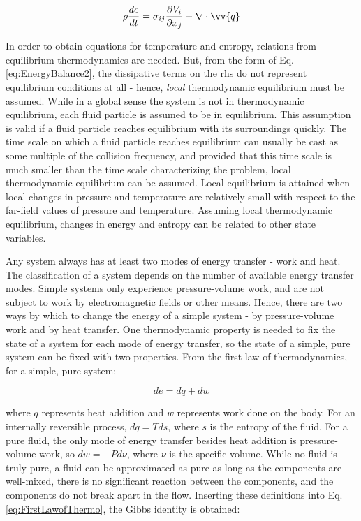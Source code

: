 \documentclass[10pt]{article}
\numberwithin{equation}{section} %
\begin{document}
\begin{equation}
\label{eq:InternalEnergyEquation}
\rho\frac{de}{dt}=\sigma_{ij}\frac{\partial V_i}{\partial x_j}-\nabla\cdot\vv{q}
\end{equation}

In order to obtain equations for temperature and entropy, relations from equilibrium thermodynamics are needed. But, from the form of Eq. \eqref{eq:EnergyBalance2}, the dissipative terms on the \gls{rhs} do not represent equilibrium conditions at all - hence, \textit{local} thermodynamic equilibrium must be assumed. While in a global sense the system is not in thermodynamic equilibrium, each fluid particle is assumed to be in equilibrium. This assumption is valid if a fluid particle reaches equilibrium with its surroundings quickly. The time scale on which a fluid particle reaches equilibrium can usually be cast as some multiple of the collision frequency, and provided that this time scale is much smaller than the time scale characterizing the problem, local thermodynamic equilibrium can be assumed. Local equilibrium is attained when local changes in pressure and temperature are relatively small with respect to the far-field values of pressure and temperature. Assuming local thermodynamic equilibrium, changes in energy and entropy can be related to other state variables. 

Any system always has at least two modes of energy transfer - work and heat. The classification of a system depends on the number of available energy transfer modes. Simple systems only experience pressure-volume work, and are not subject to work by electromagnetic fields or other means. Hence, there are two ways by which to change the energy of a simple system - by pressure-volume work and by heat transfer. One thermodynamic property is needed to fix the state of a system for each mode of energy transfer, so the state of a simple, pure system can be fixed with two properties. From the first law of thermodynamics, for a simple, pure system:

\begin{equation}
\label{eq:FirstLawofThermo}
de=dq+dw
\end{equation}

where \(q\) represents heat addition and \(w\) represents work done on the body. For an internally reversible process, \(dq=Tds\), where \(s\) is the entropy of the fluid. For a pure fluid, the only mode of energy transfer besides heat addition is pressure-volume work, so \(dw=-Pd\nu\), where \(\nu\) is the specific volume. While no fluid is truly pure, a fluid can be approximated as pure as long as the components are well-mixed, there is no significant reaction between the components, and the components do not break apart in the flow. Inserting these definitions into Eq. \eqref{eq:FirstLawofThermo}, the Gibbs identity is obtained:
\end{document}
